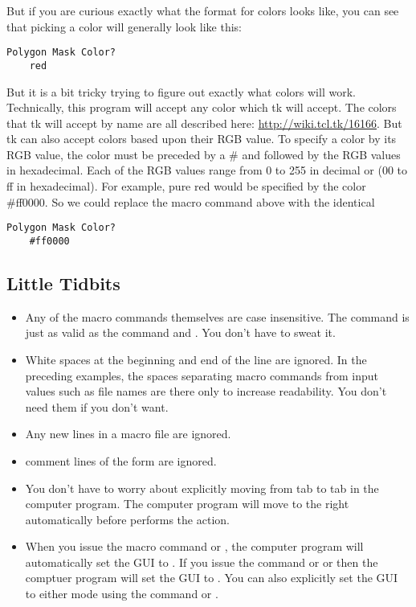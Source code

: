 But if you are curious exactly what the format for
colors looks like, you can see that picking a color
will generally look like this:
\begin{lstlisting}[caption={'Use the Folder Syntax'}]
Polygon Mask Color?
    red
\end{lstlisting}
But it is a bit tricky trying to figure out exactly what 
colors will work. Technically, this program will accept 
any color which tk will accept. The colors that tk
will accept by name are all described here:
\url{http://wiki.tcl.tk/16166}. But tk can also accept
colors based upon their RGB value. To specify a color
by its RGB value, the color must be preceded by a \#
and followed by the RGB values in hexadecimal.
Each of the RGB values range from 0 to 255 in
decimal or (00 to ff in hexadecimal).
For example, pure red would be specified by the color
\#ff0000. So we could replace the macro command above
with the identical
\begin{lstlisting}[caption={'Use the Folder Syntax'}]
Polygon Mask Color?
    #ff0000
\end{lstlisting}

\subsection{Little Tidbits}\label{Little Tidbits}
\begin{itemize}
    \item Any of the macro commands themselves are case
    insensitive. The command  
    is just as valid as the command 
     and 
    . You don't have to sweat it. 
    \item White spaces at the beginning and end of the 
    line are ignored. In the preceding examples, the
    spaces separating macro commands from input values
    such as file names are there only to increase 
    readability. You don't need them if you don't 
    want.
    \item Any new lines in a macro file are ignored.
    \item comment lines of the form 
     are ignored.
    \item You don't have to worry about explicitly moving 
    from tab to tab in the computer program. The computer 
    program will move to the right automatically before
    performs the action.
    \item When you issue the macro command  
    or , the computer program will
    automatically set the GUI to .
    If you issue the command or  or
     then the comptuer program
    will set the GUI to . You
    can also explicitly set the GUI to either mode using
    the command  or
    .
\end{itemize}


